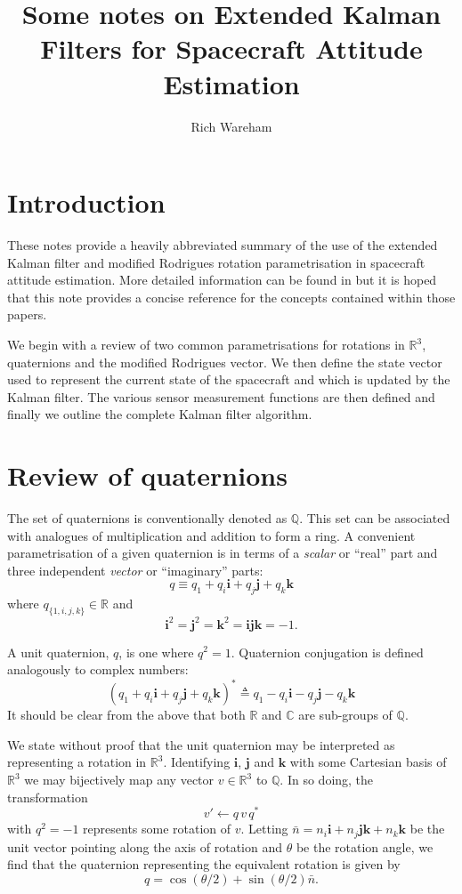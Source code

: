 \documentclass[a4paper]{paper}
\title{Some notes on Extended Kalman Filters for Spacecraft Attitude Estimation}
\author{Rich Wareham}
\begin{document}
\maketitle

\section{Introduction}

These notes provide a heavily abbreviated summary of the use of the extended
Kalman filter and modified Rodrigues rotation parametrisation in spacecraft
attitude estimation. More detailed information can be found in
\cite{crassidis1996attitude, karlgaard2009nonsingular} but it is hoped that this
note provides a concise reference for the concepts contained within those
papers.

We begin with a review of two common parametrisations for rotations in
$\mathbb{R}^3$, quaternions and the modified Rodrigues vector. We then define
the state vector used to represent the current state of the spacecraft and which
is updated by the Kalman filter. The various sensor measurement functions are
then defined and finally we outline the complete Kalman filter algorithm.

\section{Review of quaternions}

The set of quaternions is conventionally denoted as $\mathbb{Q}$. This set can
be associated with analogues of multiplication and addition to form a ring.  A
convenient parametrisation of a given quaternion is in terms of a
\emph{scalar} or ``real'' part and three independent \emph{vector} or
``imaginary'' parts:
$$
q \equiv q_1 + q_i \mathbf{i} + q_j \mathbf{j} + q_k \mathbf{k}
$$
where $q_{\{1,i,j,k\}} \in \mathbb{R}$ and
$$
\mathbf{i}^2 = \mathbf{j}^2 = \mathbf{k}^2 = \mathbf{ijk} = -1.
$$

A unit quaternion, $q$, is one where $q^2 = 1$. Quaternion conjugation is
defined analogously to complex numbers:
$$
\left(
	q_1 + q_i \mathbf{i} + q_j \mathbf{j} + q_k \mathbf{k}
\right)^* \triangleq
	q_1 - q_i \mathbf{i} - q_j \mathbf{j} - q_k \mathbf{k}
$$
It should be clear from the above that both $\mathbb{R}$ and $\mathbb{C}$ are
sub-groups of $\mathbb{Q}$.

We state without proof that the unit quaternion may be interpreted as
representing a rotation in $\mathbb{R}^3$. Identifying $\mathbf{i}$,
$\mathbf{j}$ and $\mathbf{k}$ with some Cartesian basis of $\mathbb{R}^3$ we may
bijectively map any vector $v \in \mathbb{R}^3$ to $\mathbb{Q}$. In so doing,
the transformation
$$
v' \leftarrow q \, v \, q^*
$$
with $q^2 = -1$ represents some rotation of $v$. Letting $\bar{n} = n_i
\mathbf{i} + n_j \mathbf{jk} + n_k \mathbf{k}$ be the unit vector pointing along
the axis of rotation and $\theta$ be the rotation angle, we find that the
quaternion representing the equivalent rotation is given by
$$
q = \cos\left(\theta / 2\right) + \sin\left(\theta / 2\right) \bar{n}.
$$
\end{document}
